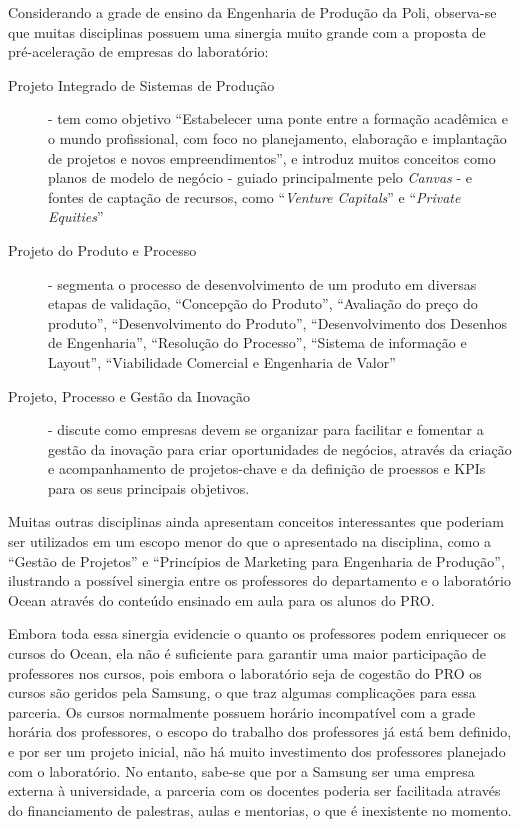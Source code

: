 Considerando a grade de ensino da Engenharia de Produção da Poli, observa-se que muitas disciplinas possuem uma sinergia muito grande com a proposta de pré-aceleração de empresas do laboratório: 

\begin{description}
\item[Projeto Integrado de Sistemas de Produção] - tem como objetivo \enquote{Estabelecer uma ponte entre a formação acadêmica e o mundo profissional, com foco no planejamento, elaboração e implantação de projetos e novos empreendimentos}, e introduz muitos conceitos como planos de modelo de negócio - guiado principalmente pelo \textit{Canvas} - e fontes de captação de recursos, como \enquote{\textit{Venture Capitals}} e \enquote{\textit{Private Equities}}

\item[Projeto do Produto e Processo] - segmenta o processo de desenvolvimento de um produto em diversas etapas de validação, \enquote{Concepção do Produto}, \enquote{Avaliação do preço do produto}, \enquote{Desenvolvimento do Produto}, \enquote{Desenvolvimento dos Desenhos de Engenharia}, \enquote{Resolução do Processo}, \enquote{Sistema de informação e Layout}, \enquote{Viabilidade Comercial e Engenharia de Valor}

\item[Projeto, Processo e Gestão da Inovação] - discute como empresas devem se organizar para facilitar e fomentar a gestão da inovação para criar oportunidades de negócios, através da criação e acompanhamento de projetos-chave e da definição de proessos e KPIs para os seus principais objetivos.

\end{description}

Muitas outras disciplinas ainda apresentam conceitos interessantes que poderiam ser utilizados em um escopo menor do que o apresentado na disciplina, como a \enquote{Gestão de Projetos} e \enquote{Princípios de Marketing para Engenharia de Produção}, ilustrando a possível sinergia entre os professores do departamento e o laboratório Ocean através do conteúdo ensinado em aula para os alunos do PRO.

Embora toda essa sinergia evidencie o quanto os professores podem enriquecer os cursos do Ocean, ela não é suficiente para garantir uma maior participação de professores nos cursos, pois embora o laboratório seja de cogestão do PRO os cursos são geridos pela Samsung, o que traz algumas complicações para essa parceria. Os cursos normalmente possuem horário incompatível com a grade horária dos professores, o escopo do trabalho dos professores já está bem definido, e por ser um projeto inicial, não há muito investimento dos professores planejado com o laboratório. No entanto, sabe-se que por a Samsung ser uma empresa externa à universidade, a parceria com os docentes poderia ser facilitada através do financiamento de palestras, aulas e mentorias, o que é inexistente no momento.

